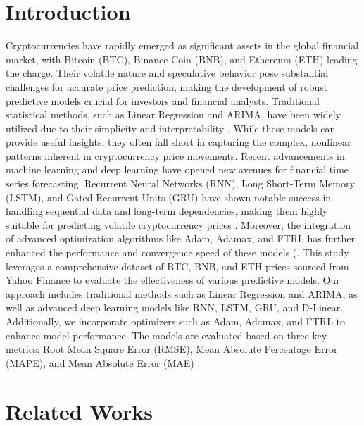 \documentclass{ieeeojies}
\begin{document}
\section{Introduction}
\label{sec:introduction}
\vspace{0.3cm}
Cryptocurrencies have rapidly emerged as significant assets in the global financial market, with Bitcoin (BTC), Binance Coin (BNB), and Ethereum (ETH) leading the charge. Their volatile nature and speculative behavior pose substantial challenges for accurate price prediction, making the development of robust predictive models crucial for investors and financial analysts.
Traditional statistical methods, such as Linear Regression and ARIMA, have been widely utilized due to their simplicity and interpretability \cite{Intro_1}. While these models can provide useful insights, they often fall short in capturing the complex, nonlinear patterns inherent in cryptocurrency price movements.
Recent advancements in machine learning and deep learning have opened new avenues for financial time series forecasting. Recurrent Neural Networks (RNN), Long Short-Term Memory (LSTM), and Gated Recurrent Units (GRU) have shown notable success in handling sequential data and long-term dependencies, making them highly suitable for predicting volatile cryptocurrency prices \cite{Intro_2}. Moreover, the integration of advanced optimization algorithms like Adam, Adamax, and FTRL has further enhanced the performance and convergence speed of these models (\cite{Intro_3}.
This study leverages a comprehensive dataset of BTC, BNB, and ETH prices sourced from Yahoo Finance to evaluate the effectiveness of various predictive models. Our approach includes traditional methods such as Linear Regression and ARIMA, as well as advanced deep learning models like RNN, LSTM, GRU, and D-Linear. Additionally, we incorporate optimizers such as Adam, Adamax, and FTRL to enhance model performance. The models are evaluated based on three key metrics: Root Mean Square Error (RMSE), Mean Absolute Percentage Error (MAPE), and Mean Absolute Error (MAE) \cite{Intro_4}.
\section{Related Works}
\end{document}
